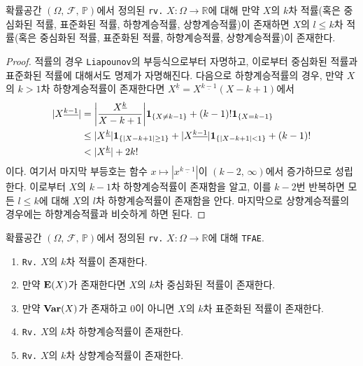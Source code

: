 \begin{proposition}\label{prop:lowerMomentExist}
    확률공간 $(\Omega,\,\mathcal{F},\,\mathbb{P})$에서 정의된 \texttt{rv.} $X:\Omega\to\mathbb{R}$에 대해 만약 $X$의 $k$차 적률(혹은 중심화된 적률, 표준화된 적률, 하향계승적률, 상향계승적률)이 존재하면 $X$의 $l\leq k$차 적률(혹은 중심화된 적률, 표준화된 적률, 하향계승적률, 상향계승적률)이 존재한다.
\end{proposition}

\begin{proof}
    적률의 경우 \texttt{Liapounov}의 부등식으로부터 자명하고, 이로부터 중심화된 적률과 표준화된 적률에 대해서도 명제가 자명해진다. 다음으로 하향계승적률의 경우, 만약 $X$의 $k>1$차 하향계승적률이 존재한다면 $X^{\underline{k}}=X^{\underline{k-1}}(X-k+1)$에서
    \begin{align*}
        |X^{\underline{k-1}}|&=\bigg|\frac{X^{\underline{k}}}{X-k+1}\bigg|\ind_{\{X\ne k-1\}}+(k-1)!\ind_{\{X=k-1\}}\\
        &\leq|X^{\underline{k}}|\ind_{\{|X-k+1|\geq1\}}+|X^{\underline{k-1}}|\ind_{\{|X-k+1|<1\}}+(k-1)!\\
        &<|X^{\underline{k}}|+2k!
    \end{align*}
    이다. 여기서 마지막 부등호는 함수 $x\mapsto|x^{\underline{k-1}}|$이 $(k-2,\,\infty)$에서 증가하므로 성립한다. 이로부터 $X$의 $k-1$차 하향계승적률이 존재함을 알고, 이를 $k-2$번 반복하면 모든 $l\leq k$에 대해 $X$의 $l$차 하향계승적률이 존재함을 안다. 마지막으로 상향계승적률의 경우에는 하향계승적률과 비슷하게 하면 된다.
\end{proof}

\begin{proposition}\label{prop:momentExist}
    확률공간 $(\Omega,\,\mathcal{F},\,\mathbb{P})$에서 정의된 \texttt{rv.} $X:\Omega\to\mathbb{R}$에 대해 \texttt{TFAE}.
    \begin{enumerate}
        \item \texttt{Rv.} $X$의 $k$차 적률이 존재한다.
        \item 만약 $\mathbf{E}(X)$가 존재한다면 $X$의 $k$차 중심화된 적률이 존재한다.
        \item 만약 $\mathbf{Var}(X)$가 존재하고 $0$이 아니면 $X$의 $k$차 표준화된 적률이 존재한다.
        \item \texttt{Rv.} $X$의 $k$차 하향계승적률이 존재한다.
        \item \texttt{Rv.} $X$의 $k$차 상향계승적률이 존재한다.
    \end{enumerate}
\end{proposition}

